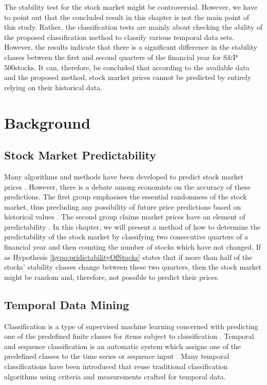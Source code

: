 The stability test for the stock market might be controversial. However, we have to point out that the concluded result in this chapter is not the main point of this study. Rather, the classification tests are mainly about checking the ability of the proposed classification method to classify various temporal data sets. However, the results indicate that there is a significant difference in the stability classes between the first and second quarters of the financial year for S\&P\,500stocks. It can, therefore, be concluded that according to the available data and the proposed method, stock market prices cannot be predicted by entirely relying on their historical data.

\section{Background}

\subsection{Stock Market Predictability}
Many algorithms and methods have been developed to predict stock market prices \cite{Atsalakis2013}. However, there is a debate among economists on the accuracy of these predictions. The first group emphasises the essential randomness of the stock market, thus precluding any possibility of future price predictions based on historical values \cite{Fama1965}. The second group claims market prices have an element of predictability \cite{Lo1988}. In this chapter, we will present a method of how to determine the predictability of the stock market by classifying two consecutive quarters of a financial year and then counting the number of stocks which have not changed. If as Hypothesis \ref{hypo:pridictabilityOfStocks} states that if more than half of the stocks' stability classes change between these two quarters, then the stock market might be random and, therefore, not possible to predict their prices.

\subsection{Temporal Data Mining}

Classification is a type of supervised machine learning concerned with predicting one of the predefined finite classes for items subject to classification \cite{Zaki2014}. Temporal and sequence classification is an automatic system which assigns one of the predefined classes to the time series or sequence input \cite{Laxman2006}. Many temporal classifications have been introduced that reuse traditional classification algorithms using criteria and measurements crafted for temporal data.

